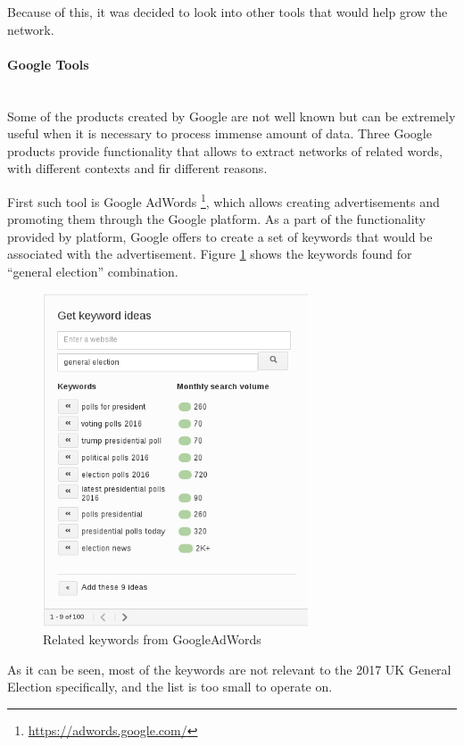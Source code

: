 Because of this, it was decided to look into other tools that would help grow the network.

\paragraph{Google Tools}\mbox{}\\
Some of the products created by Google are not well known but can be extremely useful when it is necessary to process immense amount of data. Three Google products provide functionality that allows to extract networks of related words, with different contexts and fir different reasons.

First such tool is Google AdWords \footnote{\url{https://adwords.google.com/}}, which allows creating advertisements and promoting them through the Google platform. As a part of the functionality provided by platform, Google offers to create a set of keywords that would be associated with the advertisement. Figure \ref{fig:googleads} shows the keywords found for ``general election'' combination. 

\begin{figure}[ht]
\includegraphics[width=0.7\textwidth]{googleads}
\caption{Related keywords from GoogleAdWords}
\label{fig:googleads}
\end{figure}

As it can be seen, most of the keywords are not relevant to the 2017 UK General Election specifically, and the list is too small to operate on.

